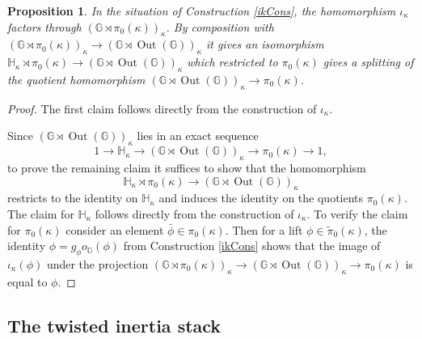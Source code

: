 \documentclass{article}
\newcommand{\BG}{{\mathbb{G}}}
\newcommand{\BH}{{\mathbb{H}}}
\DeclareMathOperator{\Out}{Out}
\theoremstyle{definition}
\theoremstyle{plain}
\newtheorem{proposition}[definition]{Proposition}
\begin{document}
\begin{proposition} \label{ikProps}
  In the situation of Construction \ref{ikCons}, the homomorphism $\iota_\kappa$ factors through $(\BG\rtimes \pi_0(\kappa))_\kappa$. By composition with $(\BG\rtimes \pi_0(\kappa))_\kappa \to (\BG \rtimes \Out(\BG))_\kappa$ it gives an isomorphism $\BH_\kappa \rtimes \pi_0(\kappa) \to (\BG \rtimes \Out(\BG))_\kappa$ which restricted to $\pi_0(\kappa)$ gives a splitting of the quotient homomorphism $(\BG \rtimes \Out(\BG))_\kappa \to \pi_0(\kappa)$. 
\end{proposition}
\begin{proof}
  The first claim follows directly from the construction of $\iota_\kappa$.

Since $(\BG \rtimes \Out(\BG))_\kappa$ lies in an exact sequence
\begin{equation*}
  1 \to \BH_\kappa \to (\BG \rtimes \Out(\BG))_\kappa \to \pi_0(\kappa) \to 1,
\end{equation*}
to prove the remaining claim it suffices to show that the homomorphism $$\BH_\kappa \rtimes \pi_0(\kappa) \to (\BG\rtimes \Out(\BG))_\kappa$$ restricts to the identity on $\BH_\kappa$ and induces the identity on the quotients $\pi_0(\kappa)$. The claim for $\BH_\kappa$ follows directly from the construction of $\iota_\kappa$. To verify the claim for $\pi_0(\kappa)$ consider an element $\bar \phi \in \pi_0(\kappa)$. Then for a lift $\phi \in \tilde \pi_0(\kappa)$, the identity $\phi=g_\phi o_\BG(\phi)$ from Construction \ref{ikCons} shows that the image of $\iota_\kappa(\phi)$ under the projection $(\BG\rtimes \pi_0(\kappa))_\kappa \to (\BG \rtimes \Out(\BG))_\kappa \to \pi_0(\kappa)$ is equal to $\phi$.
\end{proof}

\subsection{The twisted inertia stack}
\end{document}
